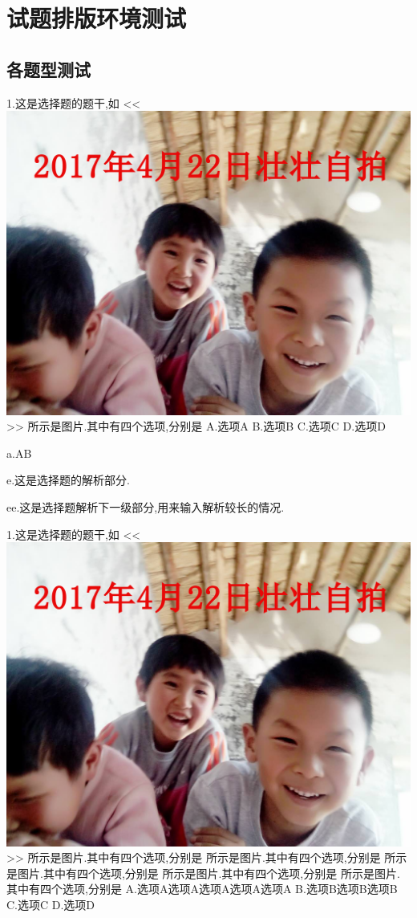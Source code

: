 \documentclass[a4paper,fontset = windowsnew]{ctexbook}
\begin{document}

\chapter{试题排版环境测试}

\section{各题型测试}


\begin{choices}[exp]
  1.这是选择题的题干,如
  <<
  \includegraphics[scale=0.2]{2.jpg}
  >>
  所示是图片.其中有四个选项,分别是
  A.选项A
  B.选项B
  C.选项C
  D.选项D

  a.AB

  e.这是选择题的解析部分.

  ee.这是选择题解析下一级部分,用来输入解析较长的情况.

  1.这是选择题的题干,如
  <<
  \includegraphics[scale=0.15]{2.jpg}
  >>
  所示是图片.其中有四个选项,分别是
  所示是图片.其中有四个选项,分别是
  所示是图片.其中有四个选项,分别是
  所示是图片.其中有四个选项,分别是
  所示是图片.其中有四个选项,分别是
  A.选项A选项A选项A选项A选项A
  B.选项B选项B选项B
  C.选项C
  D.选项D


\end{choices}
\end{document}

